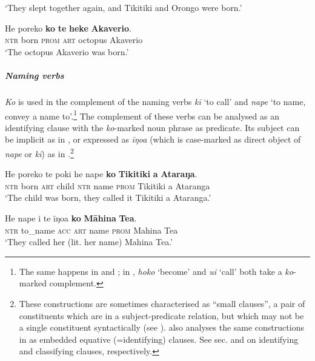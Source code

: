 \glt 
‘They slept together again, and Tikitiki and Orongo were born.’ \textstyleExampleref{[R234.007]} 
\z

\ea\label{ex:8.146}
\gll He poreko \textbf{ko} \textbf{te} \textbf{heke} \textbf{{\ꞌ}Akaverio}. \\
\textsc{ntr} born \textsc{prom} \textsc{art} octopus Akaverio \\

\glt 
‘The octopus Akaverio was born.’ \textstyleExampleref{[Mtx-7-14.003]}
\z

\subparagraph{Naming verbs} \textit{Ko} is used in the complement of the naming verbs \textit{kī} ‘to call’ and \textit{nape} ‘to name, convey a name to’.\footnote{\label{fn:441}The same happens in  and  \citep[45]{Clark1976}; in , \textit{hoko} ‘become’ and \textit{ui} ‘call’ both take a \textit{ko}{}-marked complement.} The complement of these verbs can be analysed as an identifying clause with the \textit{ko}{}-marked noun phrase as predicate. Its subject can be implicit as in , or expressed as \textit{{\ꞌ}īŋoa} (which is case-marked as direct object of \textit{nape} or \textit{kī}) as in .\footnote{\label{fn:442}These constructions are sometimes characterised as “small clauses”, a pair of constituents which are in a subject{}-predicate relation, but which may not be a single constituent syntactically (see \citealt{Bowers2001}). \citet[12]{Bauer1991} also analyses the same constructions in  as embedded equative (=identifying) clauses. See sec.  and  on identifying and classifying clauses, respectively.}  

\ea\label{ex:8.147}
\gll He poreko te poki he nape \textbf{ko} \textbf{Tikitiki} \textbf{{\ꞌ}a} \textbf{Ataraŋa}. \\
\textsc{ntr} born \textsc{art} child \textsc{ntr} name \textsc{prom} Tikitiki a Ataranga \\

\glt 
‘The child was born, they called it Tikitiki a Ataranga.’ \textstyleExampleref{[R532-02.005]}
\z

\ea\label{ex:8.148}
\gll He nape i te {\ꞌ}īŋoa \textbf{ko} \textbf{Māhina} \textbf{Tea}. \\
\textsc{ntr} to\_name \textsc{acc} \textsc{art} name \textsc{prom} Mahina Tea \\

\glt
‘They called her (lit. her name) Mahina Tea.’ \textstyleExampleref{[R399.003]} 
\z


